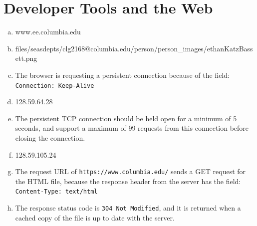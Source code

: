 \documentclass[11pt]{article}
\begin{document}
\section*{Developer Tools and the Web}
  \begin{enumerate}[(a)]
    \item
      www.ee.columbia.edu
    \item
      files/seasdepts/clg2168@columbia.edu/person/person\_images/ethanKatzBassett.png
    \item
      The browser is requesting a persistent connection because of the field:
      \texttt{Connection: Keep-Alive}
    \item
      128.59.64.28
    \item
      The persistent TCP connection should be held open for a minimum of 5 seconds,
      and support a maximum of 99 requests from this connection before closing
      the connection.
    \item
      128.59.105.24
    \item
      The request URL of \texttt{https://www.columbia.edu/} sends a GET request for
      the HTML file, because the response header from the server has the field:
      \texttt{Content-Type: text/html}
    \item
      The response status code is \texttt{304 Not Modified}, and it is returned when
      a cached copy of the file is up to date with the server.
  \end{enumerate}
\end{document}
